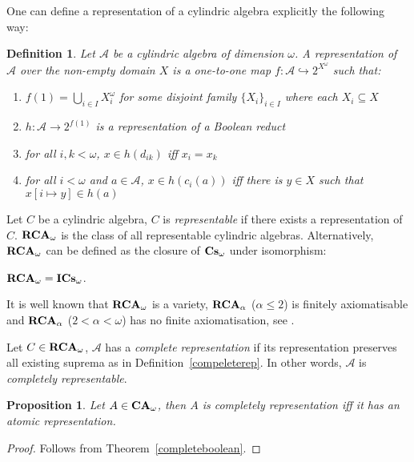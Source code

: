 \documentclass{article}
\theoremstyle{defin}
\newtheorem{definition}{Definition}
\theoremstyle{theorem}
\theoremstyle{claim}
\theoremstyle{prop}
\newtheorem{prop}{Proposition}
\theoremstyle{lemma}
\theoremstyle{fact}
\theoremstyle{remark}
\theoremstyle{ex}
\theoremstyle{col}
\theoremstyle{question}
\begin{document}
One can define a representation of a cylindric algebra explicitly the following way:

\begin{definition}
 Let $\mathcal{A}$ be a cylindric algebra of dimension $\omega$. A representation of $\mathcal{A}$ over the non-empty domain $X$ is a one-to-one map $f : \mathcal{A} \hookrightarrow 2^{X^{\omega}}$ such that:
 \begin{enumerate}
   \item $f(1) = \bigcup \limits_{i \in I} X_i^{\omega}$ for some disjoint family $\{X_i\}_{i \in I}$ where each $X_i \subseteq X$
   \item $h : \mathcal{A} \to 2^{f(1)}$ is a representation of a Boolean reduct
   \item for all $i, k < \omega$, $x \in h(d_{ik})$ iff $x_{i} = x_{k}$
   \item for all $i < \omega$ and $a \in \mathcal{A}$, $x \in h(c_{i}(a))$ iff there is $y \in X$ such that $x[i \mapsto y] \in h(a)$
 \end{enumerate}
\end{definition}

Let $C$ be a cylindric algebra, $C$ is \emph{representable} if there exists a representation of $C$. ${\bf RCA}_{\omega}$ is the class of all representable cylindric algebras. Alternatively, ${\bf RCA}_{\omega}$ can be defined as the closure of ${\bf Cs}_{\omega}$ under isomorphism:
\begin{center}
${\bf RCA}_{\omega} = {\bf ICs}_{\omega}$.
\end{center}

It is well known that ${\bf RCA}_{\omega}$ is a variety, ${\bf RCA}_{\alpha}$ ($\alpha \leq 2$) is finitely axiomatisable and ${\bf RCA}_{\alpha}$ ($2 < \alpha < \omega$) has no finite axiomatisation, see \cite{Henkin1988-HENCAP-4}.

Let $C \in {\bf RCA}_{\omega}$, $\mathcal{A}$ has a \emph{complete representation} if its representation preserves all existing suprema as in Definition~\ref{compeleterep}.
In other words, $\mathcal{A}$ is \emph{completely representable}.

\begin{prop}
Let $A \in {\bf CA}_{\omega}$, then $A$ is completely representation iff it has an atomic representation.
\end{prop}

\begin{proof}
Follows from Theorem~\ref{completeboolean}.
\end{proof}
\end{document}
